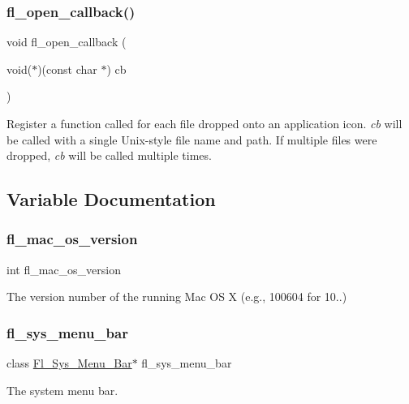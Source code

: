 \subsubsection{\texorpdfstring{fl\+\_\+open\+\_\+callback()}{fl\_open\_callback()}}
{\footnotesize\ttfamily void fl\+\_\+open\+\_\+callback (\begin{DoxyParamCaption}\item[{void($\ast$)(const char $\ast$)}]{cb }\end{DoxyParamCaption})\hspace{0.3cm}{\ttfamily [inline]}}



Register a function called for each file dropped onto an application icon. {\itshape cb} will be called with a single Unix-\/style file name and path. If multiple files were dropped, {\itshape cb} will be called multiple times. 



\subsection{Variable Documentation}
\mbox{\label{group__group__macosx_ga2c7db6b2ea9a6ae37a26bea810d2056c}} 
\subsubsection{\texorpdfstring{fl\+\_\+mac\+\_\+os\+\_\+version}{fl\_mac\_os\_version}}
{\footnotesize\ttfamily int fl\+\_\+mac\+\_\+os\+\_\+version}



The version number of the running Mac OS X (e.\+g., 100604 for 10..) 

\mbox{\label{group__group__macosx_gae169f554b5d3d2726f5e208df78e091b}} 
\subsubsection{\texorpdfstring{fl\+\_\+sys\+\_\+menu\+\_\+bar}{fl\_sys\_menu\_bar}}
{\footnotesize\ttfamily class \hyperlink{_fl___sys___menu___bar_8_h_a615bb5494aaeeb4298839e7a7cbcd09d}{Fl\+\_\+\+Sys\+\_\+\+Menu\+\_\+\+Bar}$\ast$ fl\+\_\+sys\+\_\+menu\+\_\+bar}

The system menu bar. 